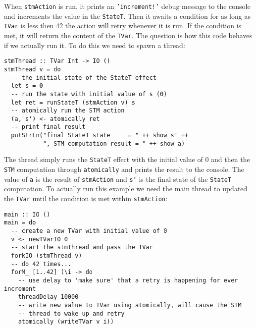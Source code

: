 When \texttt{stmAction} is run, it prints an \texttt{'increment!'} debug message to the console and increments the value in the \texttt{StateT}. Then it awaits a condition for as long as \texttt{TVar} is less then 42 the action will retry whenever it is run. If the condition is met, it will return the content of the \texttt{TVar}. The question is how this code behaves if we actually run it. To do this we need to spawn a thread:

\begin{footnotesize}
\begin{verbatim}
stmThread :: TVar Int -> IO ()
stmThread v = do
  -- the initial state of the StateT effect
  let s = 0
  -- run the state with initial value of s (0)
  let ret = runStateT (stmAction v) s
  -- atomically run the STM action
  (a, s') <- atomically ret
  -- print final result
  putStrLn("final StateT state     = " ++ show s' ++
           ", STM computation result = " ++ show a)
\end{verbatim}
\end{footnotesize}

The thread simply runs the \texttt{StateT} effect with the initial value of 0 and then the \texttt{STM} computation through \texttt{atomically} and prints the result to the console. The value of \texttt{a} is the result of \texttt{stmAction} and \texttt{s'} is the final state of the \texttt{StateT} computation. To actually run this example we need the main thread to updated the \texttt{TVar} until the condition is met within \texttt{stmAction}:

\begin{footnotesize}
\begin{verbatim}
main :: IO ()
main = do
  -- create a new TVar with initial value of 0
  v <- newTVarIO 0 
  -- start the stmThread and pass the TVar
  forkIO (stmThread v)
  -- do 42 times...
  forM_ [1..42] (\i -> do
    -- use delay to 'make sure' that a retry is happening for ever increment
    threadDelay 10000
    -- write new value to TVar using atomically, will cause the STM
    -- thread to wake up and retry
    atomically (writeTVar v i))
\end{verbatim}
\end{footnotesize}

